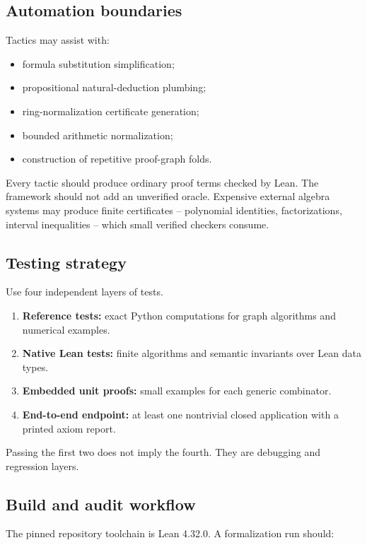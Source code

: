 \subsection{Automation boundaries}

Tactics may assist with:
\begin{itemize}
\item formula substitution simplification;
\item propositional natural-deduction plumbing;
\item ring-normalization certificate generation;
\item bounded arithmetic normalization;
\item construction of repetitive proof-graph folds.
\end{itemize}

Every tactic should produce ordinary proof terms checked by Lean.  The framework should not add an unverified oracle.  Expensive external algebra systems may produce finite certificates -- polynomial identities, factorizations, interval inequalities -- which small verified checkers consume.

\subsection{Testing strategy}

Use four independent layers of tests.

\begin{enumerate}
\item \textbf{Reference tests:} exact Python computations for graph algorithms and numerical examples.
\item \textbf{Native Lean tests:} finite algorithms and semantic invariants over Lean data types.
\item \textbf{Embedded unit proofs:} small  examples for each generic combinator.
\item \textbf{End-to-end endpoint:} at least one nontrivial closed application with a printed axiom report.
\end{enumerate}

Passing the first two does not imply the fourth.  They are debugging and regression layers.

\subsection{Build and audit workflow}

The pinned repository toolchain is Lean 4.32.0.  A formalization run should:

